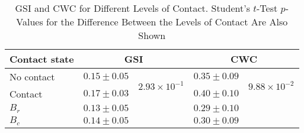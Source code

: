 \begin{table}[!t]
\caption{GSI and CWC for Different Levels of Contact. Student's $t$-Test $p$-Values for the Difference Between the Levels of Contact Are Also Shown\label{tab:sync_stats_contact}}
\centering
\begin{tabular}{lcccc}
\toprule
Contact state & \multicolumn{2}{c}{GSI} & \multicolumn{2}{c}{CWC} \\
\midrule
No contact & $0.15 \pm 0.05$ & \multirow{2}{*}{$2.93 \times 10^{-1}$} &$0.35 \pm 0.09$ & \multirow{2}{*}{$9.88 \times 10^{-2}$}  \\
Contact & $0.17 \pm 0.03$ & &$0.40 \pm 0.10$ & \\
\midrule
$B_r$ & $0.13 \pm 0.05$ & & $0.29 \pm 0.10$ & \\
$B_c$ & $0.14 \pm 0.05$ & & $0.30 \pm 0.09$ & \\
\bottomrule
\end{tabular}
\end{table}
